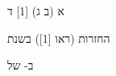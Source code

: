 \documentclass{closettwin}
\begin{document}
\Huge
\begin{hebrewpage}
א (ב ג) [1] ד\par
החזרות (ראו [1]) בשנת\par
ב- של \par
\end{hebrewpage}
\end{document}
